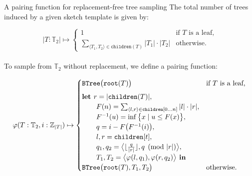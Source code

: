 \documentclass{beamer}
\begin{document}
\begin{frame}[fragile]{A pairing function for replacement-free tree sampling}
  The total number of trees induced by a given sketch template is given by:

  \begin{equation*}
    |T: \mathbb{T}_2| \mapsto \begin{cases}
                                1  & \text{if $T$ is a leaf,} \\
                                \sum_{\langle T_1, T_2\rangle \in \texttt{children}(T)} |T_1| \cdot |T_2| & \text{otherwise.}
    \end{cases}
  \end{equation*}\\

  To sample from $\mathbb{T}_2$ without replacement, we define a pairing function:

\begin{footnotesize}
  \begin{equation*}
  \varphi(T: \mathbb{T}_2, i: \mathbb{Z}_{|T|}) \mapsto \begin{cases}
  \texttt{BTree}\big(\texttt{root}(T)\big) & \text{if $T$ is a leaf,} \vspace{5pt}\\
  \textbf{let } r = |\texttt{children}(T)|,\\
  \phantom{\textbf{Let }} F(n) = \sum_{\langle l, r\rangle \in \texttt{children}[0 \ldots n]}|l|\cdot|r|,\\
  \phantom{\textbf{Let }} F^{-1}(u)=\inf \big\{x \mid u \leq F(x)\big\},\\
  \phantom{\textbf{Let }} q = i - F\big(F^{-1}(i)\big),\\
  \phantom{\textbf{Let }} l, r = \texttt{children}[t],\\
  \phantom{\textbf{Let }} q_1, q_2 =\big\langle\lfloor\frac{q}{|r|}\rfloor, q \pmod{|r|}\big\rangle,\\
  \phantom{\textbf{Let }} T_1, T_2 = \big\langle\varphi(l, q_1), \varphi(r, q_2)\big\rangle \textbf{ in } \\
  \texttt{BTree}\big(\texttt{root}(T), T_1, T_2\big) & \text{otherwise.} \\
  \end{cases}
  \end{equation*}
\end{footnotesize}
\end{frame}
\end{document}
